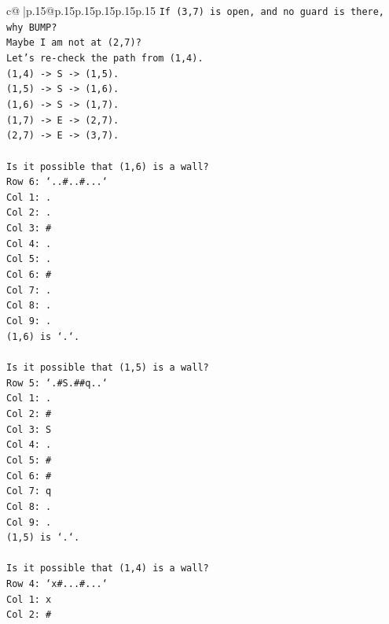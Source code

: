 \documentclass{article}
\begin{document}
{\begin{supertabular}{c@{$\;$}|p{.15\linewidth}@{}p{.15\linewidth}p{.15\linewidth}p{.15\linewidth}p{.15\linewidth}p{.15\linewidth}}
{{{\texttt{If (3,7) is open, and no guard is there, why BUMP?} \\
\texttt{Maybe I am not at (2,7)?} \\
\texttt{Let's re{-}check the path from (1,4).} \\
\texttt{(1,4) {-}> S {-}> (1,5).} \\
\texttt{(1,5) {-}> S {-}> (1,6).} \\
\texttt{(1,6) {-}> S {-}> (1,7).} \\
\texttt{(1,7) {-}> E {-}> (2,7).} \\
\texttt{(2,7) {-}> E {-}> (3,7).} \\
\\ 
\texttt{Is it possible that (1,6) is a wall?} \\
\texttt{Row 6: `..\#..\#...`} \\
\texttt{Col 1: .} \\
\texttt{Col 2: .} \\
\texttt{Col 3: \#} \\
\texttt{Col 4: .} \\
\texttt{Col 5: .} \\
\texttt{Col 6: \#} \\
\texttt{Col 7: .} \\
\texttt{Col 8: .} \\
\texttt{Col 9: .} \\
\texttt{(1,6) is `.`.} \\
\\ 
\texttt{Is it possible that (1,5) is a wall?} \\
\texttt{Row 5: `.\#S.\#\#q..`} \\
\texttt{Col 1: .} \\
\texttt{Col 2: \#} \\
\texttt{Col 3: S} \\
\texttt{Col 4: .} \\
\texttt{Col 5: \#} \\
\texttt{Col 6: \#} \\
\texttt{Col 7: q} \\
\texttt{Col 8: .} \\
\texttt{Col 9: .} \\
\texttt{(1,5) is `.`.} \\
\\ 
\texttt{Is it possible that (1,4) is a wall?} \\
\texttt{Row 4: `x\#...\#...`} \\
\texttt{Col 1: x} \\
\texttt{Col 2: \#} \\
}}}
\end{supertabular}}
\end{document}
